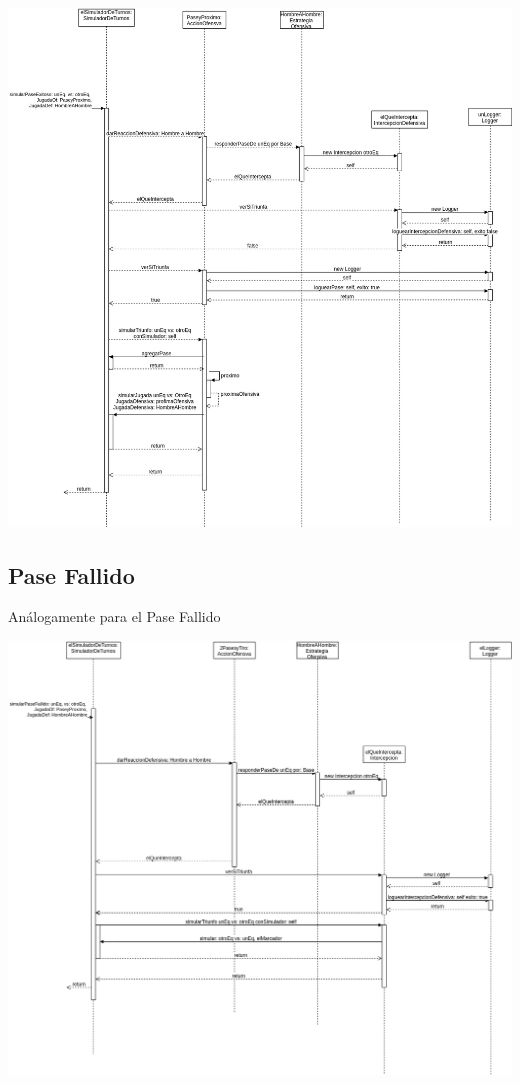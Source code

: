 \includegraphics[width=\textwidth]{imgs/PaseExitoso.png}

\subsection{Pase Fallido}

Análogamente para el Pase Fallido

\includegraphics[width=\textwidth]{imgs/PaseFallido.png}

